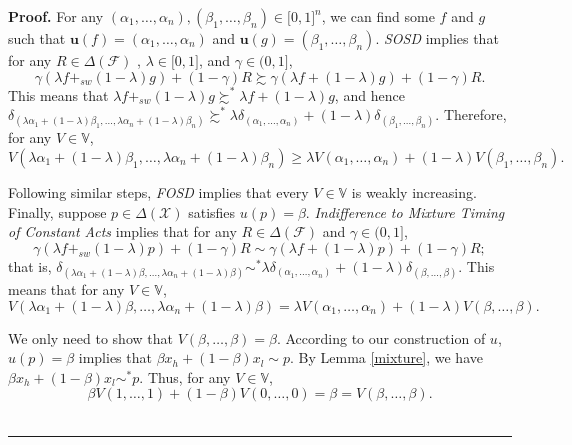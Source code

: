 \documentclass[12pt, notitlepage]{article}
\newenvironment{proof}[1][Proof]{\noindent\textbf{#1.} }{\ \rule{0.5em}{0.5em}}
\begin{document}
\begin{proof}
For any $(\alpha _{1},\dots ,\alpha _{n}),(\beta _{1},\dots ,\beta _{n})\in
\lbrack 0,1]^{n}$, we can find some $f$ and $g$ such that $\mathbf{u}%
(f)=(\alpha _{1},\dots ,\alpha _{n})$ and $\mathbf{u}(g)=(\beta _{1},\dots
,\beta _{n})$. \textit{SOSD} implies that for any $R\in \Delta (\mathcal{F})$%
, $\lambda \in \lbrack 0,1]$, and $\gamma \in (0,1]$,%
\begin{equation*}
\gamma (\lambda f+_{sw}(1-\lambda )g)+(1-\gamma )R\succsim \gamma (\lambda
f+(1-\lambda )g)+(1-\gamma )R.
\end{equation*}%
This means that $\lambda f+_{sw}(1-\lambda )g\succsim ^{\ast }\lambda
f+(1-\lambda )g$, and hence $\delta _{(\lambda \alpha _{1}+(1-\lambda )\beta
_{1},\dots ,\lambda \alpha _{n}+(1-\lambda )\beta _{n})}\succsim ^{\ast
}\lambda \delta _{(\alpha _{1},\dots ,\alpha _{n})}+(1-\lambda )\delta
_{(\beta _{1},\dots ,\beta _{n})}$. Therefore, for any $V\in \mathbb{V}$,%
\begin{equation*}
V(\lambda \alpha _{1}+(1-\lambda )\beta _{1},\dots ,\lambda \alpha
_{n}+(1-\lambda )\beta _{n})\geq \lambda V(\alpha _{1},\dots ,\alpha
_{n})+(1-\lambda )V(\beta _{1},\dots ,\beta _{n}).
\end{equation*}

Following similar steps, \textit{FOSD} implies that every $V\in \mathbb{V}$
is weakly increasing. Finally, suppose $p\in \Delta (\mathcal{X})$ satisfies 
$u(p)=\beta $. {\textit{Indifference to Mixture Timing of Constant Acts}}
implies that for any $R\in \Delta (\mathcal{F})$ and $\gamma \in (0,1]$,%
\begin{equation*}
\gamma (\lambda f+_{sw}(1-\lambda )p)+(1-\gamma )R\sim \gamma (\lambda
f+(1-\lambda )p)+(1-\gamma )R;
\end{equation*}%
that is, $\delta _{(\lambda \alpha _{1}+(1-\lambda )\beta ,\dots ,\lambda
\alpha _{n}+(1-\lambda )\beta )}\sim ^{\ast }\lambda \delta _{(\alpha
_{1},\dots ,\alpha _{n})}+(1-\lambda )\delta _{(\beta ,\dots ,\beta )}$.
This means that for any $V\in \mathbb{V}$,%
\begin{equation*}
V(\lambda \alpha _{1}+(1-\lambda )\beta ,\dots ,\lambda \alpha
_{n}+(1-\lambda )\beta )=\lambda V(\alpha _{1},\dots ,\alpha
_{n})+(1-\lambda )V(\beta ,\dots ,\beta ).
\end{equation*}

We only need to show that $V(\beta ,\dots ,\beta )=\beta $. According to our
construction of $u$, $u(p)=\beta $ implies that $\beta x_{h}+(1-\beta
)x_{l}\sim p$. By Lemma \ref{mixture}, we have $\beta x_{h}+(1-\beta
)x_{l}\sim ^{\ast }p$. Thus, for any $V\in \mathbb{V}$,%
\begin{equation*}
\beta V(1,\dots ,1)+(1-\beta )V(0,\dots ,0)=\beta =V(\beta ,\dots ,\beta ).
\end{equation*}
\end{proof}
\end{document}
